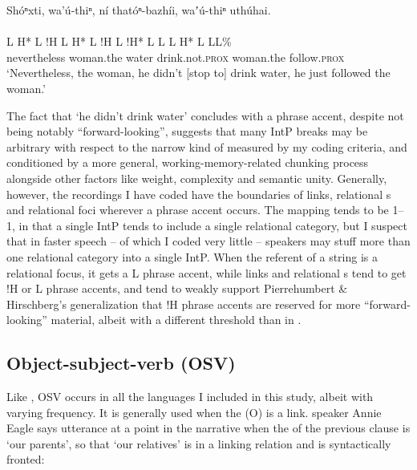 \documentclass[output=paper]{LSP/langsci}
\begin{document}
\ea\label{wolfeintp}
 	Shóⁿxti, wa’ú-thiⁿ, ní thatóⁿ-bazhíi, waʼú-thiⁿ uthúhai.\rmfnm\\
\glll	{}			 				 	\\
	{\ob L H* L !H\cb}			{\ob L H* L !H\cb}		{\ob L}		{!H* L L\cb}	{\ob L H* L}		{L\cb{}L\%}\\
	nevertheless				woman.the			water			drink.not.\textsc{prox} 		woman.the		follow.\textsc{prox}\\
\glt	`Nevertheless, the woman, he didn’t [stop to] drink water, he just followed the woman.' 
\z

The fact that  `he didn’t drink water' concludes with a phrase accent, despite not being notably “forward-looking”, suggests that many IntP breaks may be arbitrary with respect to the narrow kind of  measured by my coding criteria, and conditioned by a more general, working-memory-related chunking process alongside other factors like weight, complexity and semantic unity. Generally, however, the recordings I have coded have the boundaries of links, relational s and relational foci wherever a phrase accent occurs. The mapping tends to be 1--1, in that a single IntP tends to include a single relational category, but I suspect that in faster speech -- of which I coded very little -- speakers may stuff more than one relational category into a single IntP. When the referent of a string is a relational focus, it gets a L phrase accent, while links and relational s tend to get !H or L phrase accents, and tend to weakly support Pierrehumbert \& Hirschberg’s \citeyearpar{PierrehumbertHirschberg1990} generalization that !H phrase accents are reserved for more “forward-looking” material, albeit with a different threshold than in .

\subsection{Object-subject-verb (OSV) }\label{osv}

Like , OSV  occurs in all the languages I included in this study, albeit with varying frequency. It is generally used when the  (O) is a link.  speaker Annie Eagle says utterance  at a point in the narrative when the  of the previous clause is `our parents', so that  `our relatives' is in a linking relation and is syntactically fronted:
\end{document}
